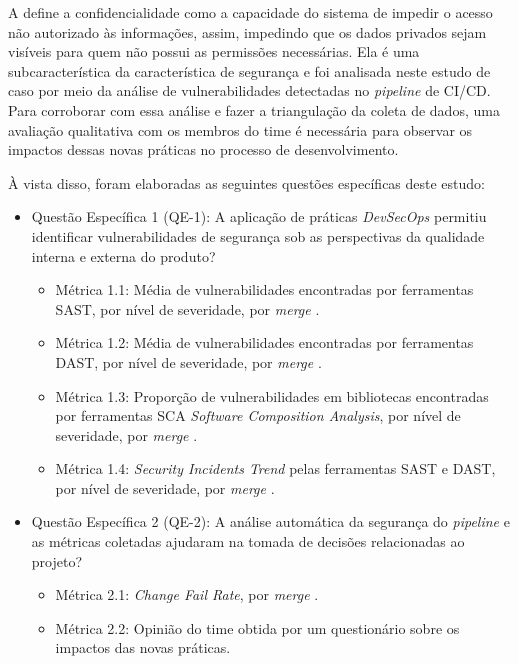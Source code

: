 A  define a confidencialidade como a capacidade do sistema de impedir o acesso não autorizado às informações, assim, impedindo que os dados privados sejam visíveis para quem não possui as permissões necessárias. Ela é uma subcaracterística da característica de segurança e foi analisada neste estudo de caso por meio da análise de vulnerabilidades detectadas no \textit{pipeline} de CI/CD. Para corroborar com essa análise e fazer a triangulação da coleta de dados, uma avaliação qualitativa com os membros do time é necessária para observar os impactos dessas novas práticas no processo de desenvolvimento.

À vista disso, foram elaboradas as seguintes questões específicas deste estudo:

\begin{itemize}
    \item Questão Específica 1 (QE-1): A aplicação de práticas \textit{DevSecOps} permitiu identificar vulnerabilidades de segurança sob as perspectivas da qualidade interna e externa do produto?
    \begin{itemize}
        \item Métrica 1.1: Média de vulnerabilidades encontradas por ferramentas SAST, por nível de severidade, por \textit{merge} \cite{ISO27004}.
        \item Métrica 1.2: Média de vulnerabilidades encontradas por ferramentas DAST, por nível de severidade, por \textit{merge} \cite{ISO27004}.
        \item Métrica 1.3: Proporção de vulnerabilidades em bibliotecas encontradas por ferramentas SCA \textit{Software Composition Analysis}, por nível de severidade, por \textit{merge} \cite{Zhang2024160317}.
        \item Métrica 1.4: \textit{Security Incidents Trend} pelas ferramentas SAST e DAST, por nível de severidade, por \textit{merge} \cite{ISO27004}.
    \end{itemize}
    \item Questão Específica 2 (QE-2): A análise automática da segurança do \textit{pipeline} e as métricas coletadas ajudaram na tomada de decisões relacionadas ao projeto?
    \begin{itemize}
        \item Métrica 2.1: \textit{Change Fail Rate}, por \textit{merge} \cite{DORA2024}.
        \item Métrica 2.2: Opinião do time obtida por um questionário sobre os impactos das novas práticas.
    \end{itemize}
\end{itemize}


